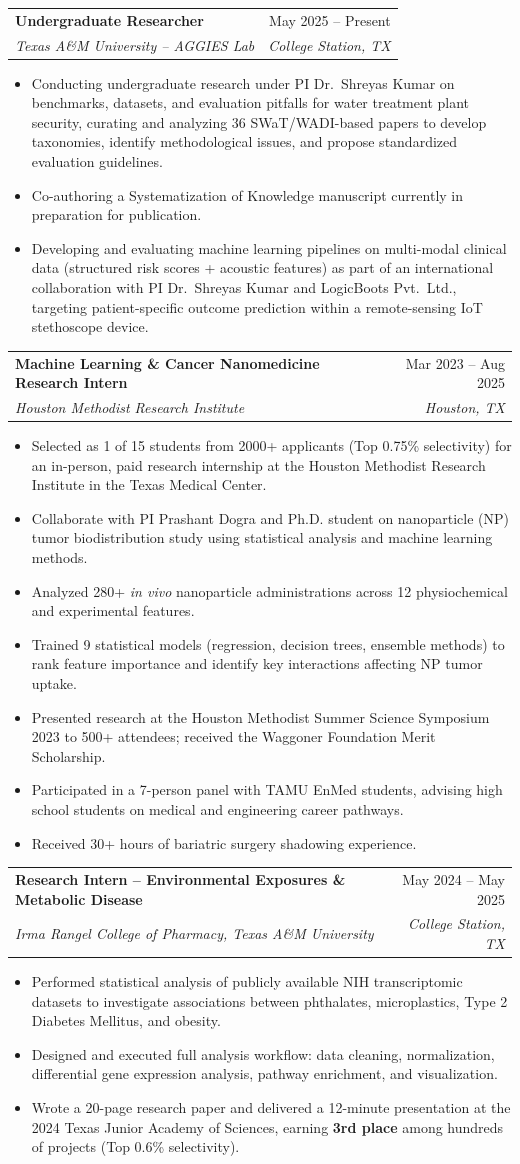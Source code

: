 \documentclass[letterpaper,11pt]{article}
\makeatletter
\newcommand{\resumeItem}[1]{
  \item\small{
    {#1 \vspace{-2pt}}
  }
}
\newcommand{\resumeSubheading}[4]{
  \vspace{-2pt}\item
    \begin{tabular*}{0.97\textwidth}[t]{l@{\extracolsep{\fill}}r}
      \textbf{#1} & #2 \\
      \textit{\small#3} & \textit{\small #4} \\
    \end{tabular*}\vspace{-7pt}
}
\newcommand{\resumeItemListStart}{\begin{itemize}}
\newcommand{\resumeItemListEnd}{\end{itemize}\vspace{-5pt}}
\makeatother
\begin{document}
    \resumeSubheading
      {Undergraduate Researcher}{May 2025 -- Present}
      {Texas A\&M University -- AGGIES Lab}{College Station, TX}
      \resumeItemListStart
        \resumeItem{Conducting undergraduate research under PI Dr.\ Shreyas Kumar on benchmarks, datasets, and evaluation pitfalls for water treatment plant security, curating and analyzing 36 SWaT/WADI-based papers to develop taxonomies, identify methodological issues, and propose standardized evaluation guidelines.}
        \resumeItem{Co-authoring a Systematization of Knowledge manuscript currently in preparation for publication.}
        \resumeItem{Developing and evaluating machine learning pipelines on multi-modal clinical data (structured risk scores + acoustic features) as part of an international collaboration with PI Dr.\ Shreyas Kumar and LogicBoots Pvt.\ Ltd., targeting patient-specific outcome prediction within a remote-sensing IoT stethoscope device.}
      \resumeItemListEnd
  
    \resumeSubheading
      {Machine Learning \& Cancer Nanomedicine Research Intern}{Mar 2023 -- Aug 2025}
      {Houston Methodist Research Institute}{Houston, TX}
      \resumeItemListStart
        \resumeItem{Selected as 1 of 15 students from 2000+ applicants (Top 0.75\% selectivity) for an in-person, paid research internship at the Houston Methodist Research Institute in the Texas Medical Center.}
        \resumeItem{Collaborate with PI Prashant Dogra and Ph.D. student on nanoparticle (NP) tumor biodistribution study using statistical analysis and machine learning methods.}
        \resumeItem{Analyzed 280+ \textit{in vivo} nanoparticle administrations across 12 physiochemical and experimental features.}
        \resumeItem{Trained 9 statistical models (regression, decision trees, ensemble methods) to rank feature importance and identify key interactions affecting NP tumor uptake.}
        \resumeItem{Presented research at the Houston Methodist Summer Science Symposium 2023 to 500+ attendees; received the Waggoner Foundation Merit Scholarship.}
        \resumeItem{Participated in a 7-person panel with TAMU EnMed students, advising high school students on medical and engineering career pathways.}
        \resumeItem{Received 30+ hours of bariatric surgery shadowing experience.}
      \resumeItemListEnd

    \resumeSubheading
      {Research Intern -- Environmental Exposures \& Metabolic Disease}{May 2024 -- May 2025}
      {Irma Rangel College of Pharmacy, Texas A\&M University}{College Station, TX}
      \resumeItemListStart
        \resumeItem{Performed statistical analysis of publicly available NIH transcriptomic datasets to investigate associations between phthalates, microplastics, Type 2 Diabetes Mellitus, and obesity.}
        \resumeItem{Designed and executed full analysis workflow: data cleaning, normalization, differential gene expression analysis, pathway enrichment, and visualization.}
        \resumeItem{Wrote a 20-page research paper and delivered a 12-minute presentation at the 2024 Texas Junior Academy of Sciences, earning \textbf{3rd place} among hundreds of projects (Top 0.6\% selectivity).}
      \resumeItemListEnd
      
\end{document}
